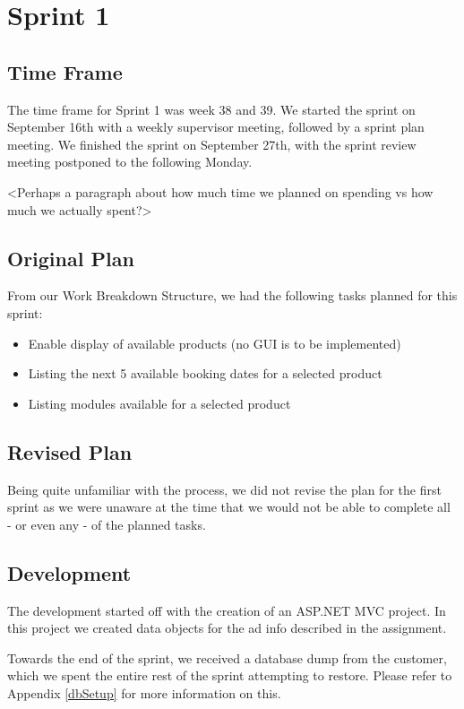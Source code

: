 \section{Sprint 1}

\subsection{Time Frame}
The time frame for Sprint 1 was week 38 and 39. We started the sprint on September 16th with a weekly supervisor meeting, followed by a sprint plan meeting. We finished the sprint on September 27th, with the sprint review meeting postponed to the following Monday.

<Perhaps a paragraph about how much time we planned on spending vs how much we actually spent?>

\subsection{Original Plan}
From our Work Breakdown Structure, we had the following tasks planned for this sprint:
\begin{itemize}
	\item Enable display of available products (no GUI is to be implemented)
	\item Listing the next 5 available booking dates for a selected product
	\item Listing modules available for a selected product
\end{itemize}

\subsection{Revised Plan}
Being quite unfamiliar with the process, we did not revise the plan for the first sprint as we were unaware at the time that we would not be able to complete all - or even any - of the planned tasks.

\subsection{Development}
The development started off with the creation of an ASP.NET MVC project. In this project we created data objects for the ad info described in the assignment.

Towards the end of the sprint, we received a database dump from the customer, which we spent the entire rest of the sprint attempting to restore. Please refer to Appendix \ref{dbSetup} for more information on this.

